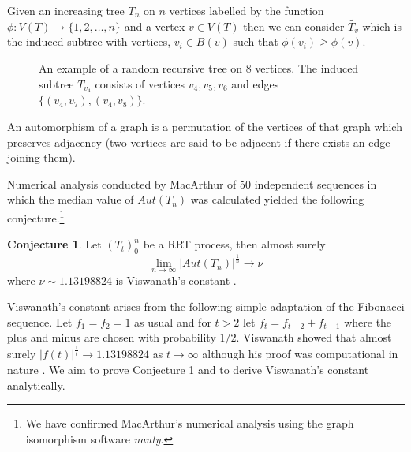 \documentclass[12pt]{article} %
\theoremstyle{definition}
\newtheorem{conj}{Conjecture}
\begin{document}
Given an increasing tree $T_{n}$ on $n$ vertices labelled by the function $\phi : V(T) \rightarrow \{1,2,\dots,n\}$ and a vertex $v \in V(T)$ then we can consider $\tilde{T_{v}}$  which is the induced subtree with vertices, $v_{i}\in B(v)$ such that $\phi(v_{i}) \geq \phi(v)$. 

 \begin{figure}[h]
\centering
{}
\caption{An example of a random recursive tree on 8 vertices.  The induced subtree $T_{v_{4}}$  consists of vertices $v_{4},v_{5},v_{6}$ and edges $\{(v_{4},v_{7}),(v_{4},v_{8})\}$. }
\end{figure}
 
An automorphism of a graph is a permutation of the vertices of that graph which preserves adjacency (two vertices are said to be adjacent if there exists an edge joining them). 

Numerical analysis conducted by  MacArthur of 50 independent sequences in which the median value of $Aut(T_{n})$ was calculated yielded the following conjecture.\footnote{We have confirmed MacArthur's numerical analysis using the graph isomorphism software \emph{nauty}.}%

\begin{conj}\label{conj1}
Let $(T_{t})_{0}^{n}$  be a RRT process, then almost surely 
\[\lim_{n \rightarrow\infty} |Aut(T_{n})|^{\frac{1}{n}} \rightarrow \nu\]
where $\nu \sim 1.13198824$ is Viswanath's constant \cite{Bens}.
\end{conj}

Viswanath's constant arises from the following simple adaptation of the Fibonacci sequence.  Let $f_{1} = f_{2} = 1$ as usual and for $t>2$ let $f_{t} = f_{t-2} \pm f_{t-1}$ where the plus and minus are chosen with probability $1/2$.  Viswanath showed that almost surely $|f(t)|^{\frac{1}{t}} \rightarrow 1.13198824 $ as $t\rightarrow\infty$ although his proof was computational in nature \cite{Viswanath}.  We aim to prove Conjecture \ref{conj1} and to derive Viswanath's constant analytically. 
\end{document}
